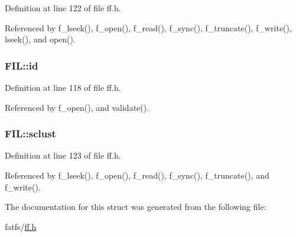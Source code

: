 Definition at line 122 of file ff.\-h.



Referenced by f\-\_\-lseek(), f\-\_\-open(), f\-\_\-read(), f\-\_\-sync(), f\-\_\-truncate(), f\-\_\-write(), lseek(), and open().

\hypertarget{structFIL_af7cae0063b0045fb7078b560101ba8f2}{
\subsubsection[{id}]{ F\-I\-L\-::id}}\label{structFIL_af7cae0063b0045fb7078b560101ba8f2}


Definition at line 118 of file ff.\-h.



Referenced by f\-\_\-open(), and validate().

\hypertarget{structFIL_ad308b74c8d6975c6a9c30d90b4124c40}{
\subsubsection[{sclust}]{ F\-I\-L\-::sclust}}\label{structFIL_ad308b74c8d6975c6a9c30d90b4124c40}


Definition at line 123 of file ff.\-h.



Referenced by f\-\_\-lseek(), f\-\_\-open(), f\-\_\-read(), f\-\_\-sync(), f\-\_\-truncate(), and f\-\_\-write().



The documentation for this struct was generated from the following file\-:\begin{DoxyCompactItemize}
\item 
fatfs/\hyperlink{ff_8h}{ff.\-h}\end{DoxyCompactItemize}
